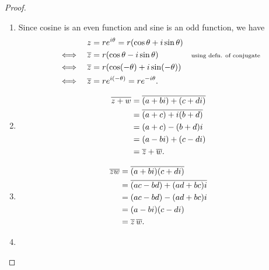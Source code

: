 \documentclass[../MathsNotesBase.tex]{subfiles}
\begin{document}
{		\medskip
		\begin{proof}\nl
			\begin{enumerate}[label=(\roman*)]
				\item{
					Since cosine is an even function and sine is an odd function, we have
					\[\begin{aligned}
						&& z &= re^{i\theta} = r(\cos\theta + i\sin\theta) \\
						&\iff & \overline{z} &= r(\cos\theta - i\sin\theta) &\text{\scriptsize{using defn. of conjugate}}\\
						&\iff & \overline{z} &= r(\cos(-\theta) + i\sin(-\theta)) \\ 
						&\iff & \overline{z} &= re^{i(-\theta)} = re^{-i\theta}.
					\end{aligned}\]
				}
				\item{
					\[\begin{aligned}
						\overline{z + w} &= \overline{(a + bi) + (c + di)} \\
						&= \overline{(a + c) + i(b + d)} \\
						&= (a + c) - (b + d)i \\
						&= (a - bi) + (c - di) \\
						&= \overline{z} + \overline{w}.
					\end{aligned}\]
				}
				\item{
					\[\begin{aligned}
						\overline{zw} &= \overline{(a + bi)(c + di)} \\
						&= \overline{(ac - bd) + (ad + bc)i} \\
						&= (ac - bd) - (ad + bc)i \\
						&= (a - bi)(c - di) \\
						&= \overline{z} \, \overline{w}.
					\end{aligned}\]
				}
				\item{
}
\end{enumerate}
\end{proof}}
\end{document}
